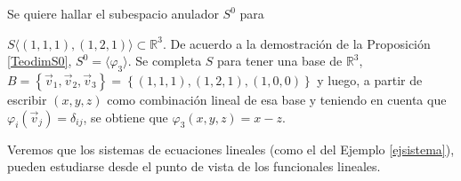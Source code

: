 \begin{example}
Se quiere hallar el subespacio anulador  $S^0$  para 

$S\langle (1,1,1),(1,2,1)\rangle \subset  \mathbb{R}^3 $.
De acuerdo a la demostración de la Proposición \ref{TeodimS0}, $S^0= \langle \varphi_3 \rangle$. Se completa $S$ para tener una  base de $\mathbb{R}^3$, $B= \left\{\vec{v}_1,\vec{v}_2,\vec{v}_3\right\}= \left\{(1,1,1), (1,2,1),(1,0,0)\right\} $ y luego, a partir de escribir $(x,y,z)$ como combinación lineal de esa base y teniendo en cuenta que  $\varphi_i(\vec{v}_j)=\delta_{ij}$, se obtiene que $\varphi_3(x,y,z)=x-z$.

\end{example}
Veremos  que los sistemas de ecuaciones lineales (como el del Ejemplo \ref{ejsistema}),  pueden estudiarse  desde el punto de vista de los funcionales lineales.

\bigskip


